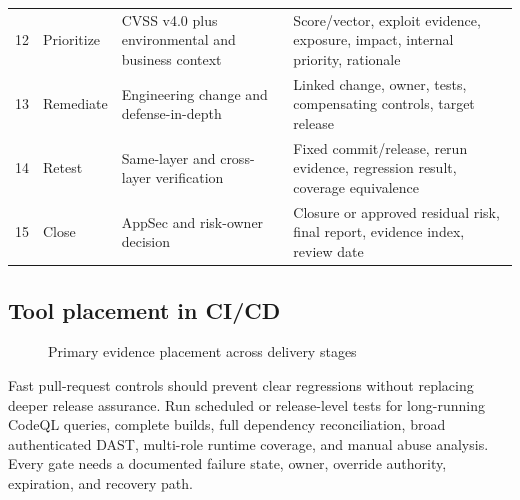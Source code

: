 \documentclass[11pt,letterpaper]{article}
\begin{document}
\begin{longtable}{@{}C{0.34in}L{1.12in}L{2.0in}L{2.9in}@{}}
12 & Prioritize & CVSS v4.0 plus environmental and business context & Score/vector, exploit evidence, exposure, impact, internal priority, rationale \\
13 & Remediate & Engineering change and defense-in-depth & Linked change, owner, tests, compensating controls, target release \\
14 & Retest & Same-layer and cross-layer verification & Fixed commit/release, rerun evidence, regression result, coverage equivalence \\
15 & Close & AppSec and risk-owner decision & Closure or approved residual risk, final report, evidence index, review date \\
\bottomrule
\end{longtable}

\subsection{Tool placement in CI/CD}

\begin{figure}[H]
\centering
{}
\caption{Primary evidence placement across delivery stages}
\label{fig:cicd-placement}
\end{figure}

Fast pull-request controls should prevent clear regressions without replacing deeper release assurance. Run scheduled or release-level tests for long-running CodeQL queries, complete builds, full dependency reconciliation, broad authenticated DAST, multi-role runtime coverage, and manual abuse analysis. Every gate needs a documented failure state, owner, override authority, expiration, and recovery path.
\end{document}
